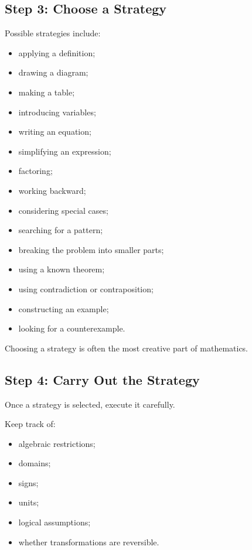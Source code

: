 \subsection{Step 3: Choose a Strategy}
\label{subsec:choose-strategy}

Possible strategies include:

\begin{itemize}
    \item applying a definition;
    \item drawing a diagram;
    \item making a table;
    \item introducing variables;
    \item writing an equation;
    \item simplifying an expression;
    \item factoring;
    \item working backward;
    \item considering special cases;
    \item searching for a pattern;
    \item breaking the problem into smaller parts;
    \item using a known theorem;
    \item using contradiction or contraposition;
    \item constructing an example;
    \item looking for a counterexample.
\end{itemize}

Choosing a strategy is often the most creative part of mathematics.

\subsection{Step 4: Carry Out the Strategy}
\label{subsec:carry-out-strategy}

Once a strategy is selected, execute it carefully.

Keep track of:

\begin{itemize}
    \item algebraic restrictions;
    \item domains;
    \item signs;
    \item units;
    \item logical assumptions;
    \item whether transformations are reversible.
\end{itemize}

